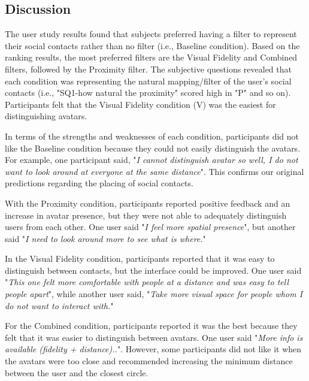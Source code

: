 \subsection{Discussion}

The user study results found that subjects preferred having a filter to represent their social contacts rather than no filter (i.e., Baseline condition). Based on the ranking results, the most preferred filters are the Visual Fidelity and Combined filters, followed by the Proximity filter.
The subjective questions revealed that each condition was representing the natural mapping/filter of the user's social contacts (i.e., "SQ1-how natural the proximity" scored high in "P" and so on). Participants felt that the Visual Fidelity condition (V) was the easiest for distinguishing avatars.

In terms of the strengths and weaknesses of each condition, participants did not like the Baseline condition because they could not easily distinguish the avatars. For example, one participant said, "\textit{I cannot distinguish avatar so well, I do not want to look around at everyone at the same distance}". This confirms our original predictions regarding the placing of social contacts.

With the Proximity condition, participants reported positive feedback and an increase in avatar presence, but they were not able to adequately distinguish users from each other.  One user said "\textit{I feel more spatial presence}", but another said "\textit{I need to look around more to see what is where.}"

In the Visual Fidelity condition, participants reported that it was easy to distinguish between contacts, but the interface could be improved. One user said "\textit{This one felt more comfortable with people at a distance and was easy to tell people apart}", while another user said, "\textit{Take more visual space for people whom I do not want to interact with.}"

For the Combined condition, participants reported it was the best because they felt that it was easier to distinguish between avatars. One user said "\textit{More info is available (fidelity + distance)..}".
However, some participants did not like it when the avatars were too close and recommended increasing the minimum distance between the user and the closest circle.

